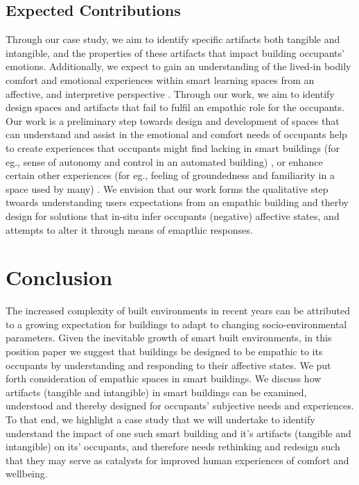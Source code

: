 \documentclass[manuscript, anonymous, review]{acmart}
\begin{document}
\subsection{Expected Contributions}
Through our case study, we aim to identify specific artifacts both tangible and intangible, and the properties of these artifacts that impact building occupants' emotions. Additionally, we expect to gain an understanding of the lived-in bodily comfort and emotional experiences within smart learning spaces from an affective, and interpretive perspective \cite{giaccardi2015foundations}. Through our work, we aim to identify design spaces and artifacts that fail to fulfil an empathic role for the occupants. Our work is a preliminary step towards design and development of spaces that can understand and assist in the emotional and comfort needs of occupants help  to create experiences that occupants might find lacking in smart buildings (for eg., sense of autonomy and control in an automated building) \cite{moreno2014user}, or enhance certain other experiences (for eg., feeling of groundedness and familiarity in a space used by many) \cite{rehman2022personalisedcomfort}. We envision that our work forms the qualitative step twoards understanding users expectations from an empathic building and therby design for solutions that in-situ infer occupants (negative) affective states, and attempts to alter it through means of emapthic responses. 







\section{Conclusion}
The increased complexity of built environments in recent years can be attributed to a growing expectation for buildings to adapt to changing socio-environmental parameters. Given the inevitable growth of smart built environments, in this position paper we suggest that buildings be designed to be empathic to its occupants by understanding and responding to their affective states. We put forth consideration of empathic spaces in smart buildings. We discuss how artifacts (tangible and intangible) in smart buildings can be examined, understood and thereby designed for occupants' subjective needs and experiences. To that end, we highlight a case study that we will undertake to identify understand the impact of one such smart building and it's artifacts (tangible and intangible) on its'  occupants, and therefore needs rethinking and redesign such that they may serve as catalysts for improved human experiences of comfort and wellbeing. 




\end{document}
